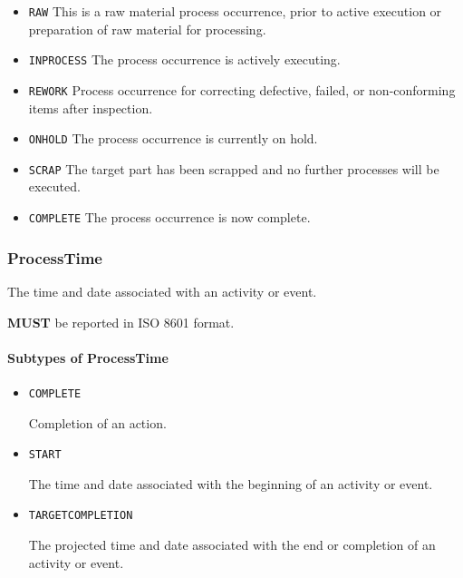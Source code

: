 \begin{itemize}
\item \texttt{RAW} \newline This is a raw material process occurrence, prior to active execution or preparation of raw material for processing. 
\item \texttt{IN\textunderscore PROCESS} \newline The process occurrence is actively executing.
 
\item \texttt{REWORK} \newline Process occurrence for correcting defective, failed, or non-conforming items after inspection. 
\item \texttt{ON\textunderscore HOLD} \newline The process occurrence is currently on hold. 
\item \texttt{SCRAP} \newline The target part has been scrapped and no further processes will be executed. 
\item \texttt{COMPLETE} \newline The process occurrence is now complete.
 
\end{itemize}



\subsubsection{ProcessTime}
\label{sec:ProcessTime}



The time and date associated with an activity or event.
  
 \textbf{MUST} be reported in ISO 8601 format.


\paragraph{Subtypes of ProcessTime}\mbox{}
\label{sec:Subtypes of ProcessTime}

\begin{itemize}

\item \texttt{COMPLETE}


Completion of an action.

\item \texttt{START}


The time and date associated with the beginning of an activity or event.

\item \texttt{TARGET\textunderscore COMPLETION}


The projected time and date associated with the end or completion of an activity or event.


\end{itemize}






